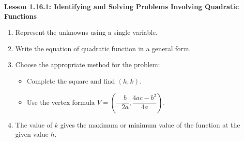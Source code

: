 \begin{center}
\textbf{Lesson 1.16.1: Identifying and Solving Problems Involving Quadratic Functions}
\end{center}


\begin{enumerate}[label = \color{blue}\arabic*. ]
\item Represent the unknowns using a single variable. 
\item Write the equation of quadratic function in a general form.
\item Choose the appropriate method for the problem: 
\begin{itemize}
\item Complete the square and find $(h, k)$. 
\item Use the vertex formula 
$ V = (-\dfrac{b}{2a}, \dfrac{4ac - b^{2}}{4a}) $. 
\end{itemize}
\item The value of $k$ gives the maximum or minimum value of the function at the given value $h$.
\end{enumerate}


